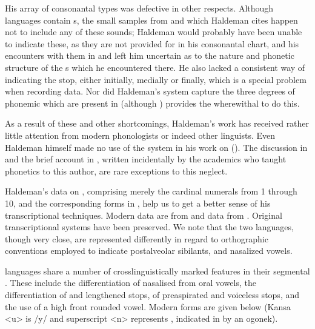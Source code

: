 \documentclass[output=paper]{LSP/langsci}
\begin{document}
 
His array of consonantal types was defective in other respects. Although  languages contain s, the small samples from  and  which Haldeman cites happen not to include any of these sounds; Haldeman would probably have been unable to indicate these, as they are not provided for in his consonantal chart, and his encounters with them in  and  left him uncertain as to the nature and phonetic structure of the s which he encountered there.  He also lacked a consistent way of indicating the  stop, either initially, medially or finally, which is a special problem when recording  data. Nor did Haldeman's system capture the three degrees of phonemic  which are present in  (although \citealt[80, \S353--355]{Haldeman1860}) provides the wherewithal to do this.  
 

As a result of these and other shortcomings, Haldeman's work has received rather little attention from modern phonologists or indeed other linguists.  Even Haldeman himself made no use of the system in his work on  (\citealt{Haldeman1872}).  The discussion in \citet{Pilling1887} and the brief account in \citet{KellyLocal1989}, written incidentally by the academics who taught phonetics to this author, are  rare exceptions to this neglect.   

 
Haldeman's data on , comprising merely the cardinal numerals from 1 through 10, and the corresponding forms in , help us to get a better sense of his transcriptional techniques. Modern  data are from \citet{Quintero2009} and  data from \citet{CumberlandRankin2012}.  Original transcriptional systems have been preserved. We note that the two languages, though very close, are represented differently in regard to orthographic conventions employed to indicate postalveolar sibilants,  and nasalized vowels. 
 

 languages share a number of crosslinguistically marked features in their segmental .  These include the differentiation of nasalised from oral vowels, the differentiation of  and lengthened stops, of preaspirated and voiceless  stops, and the use of a high front rounded vowel. Modern forms are given below (Kansa <u> is /y/ and superscript <n> represents , indicated in  by an ogonek).
\end{document}
